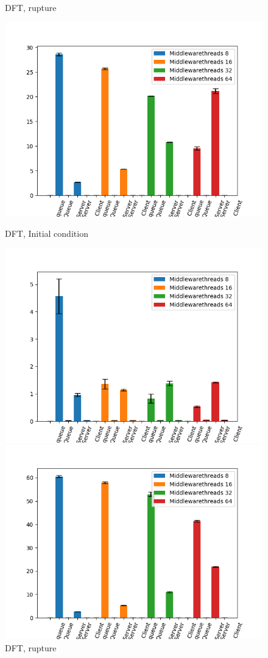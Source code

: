 \documentclass[11pt,a4paper]{article}
\begin{document}
\begin{figure}[!ht]
\begin{minipage}[b]{0.5\linewidth}
    \caption{DFT, rupture} 
    \vspace{4ex}
  \end{minipage} 
    \begin{minipage}[b]{0.5\linewidth}
    \centering
    \includegraphics[width=0.7\linewidth]{img/exp3_1/exp3_1_mw_percentile_plots_writes_0__vc_16.png} 
    \caption{DFT, Initial condition} 
    \vspace{4ex}
  \end{minipage}%
  \begin{minipage}[b]{0.5\linewidth}
    \centering
    \includegraphics[width=0.7\linewidth]{img/exp3_1/exp3_1_mw_percentile_plots_writes_1__vc_16.png} 
    \caption{DFT, rupture} 
    \vspace{4ex}
  \end{minipage} 
    \begin{minipage}[b]{0.5\linewidth}
    \centering
    \includegraphics[width=0.7\linewidth]{img/exp3_1/exp3_1_mw_percentile_plots_writes_0__vc_32.png} 

\end{minipage}
\end{figure}
\end{document}
